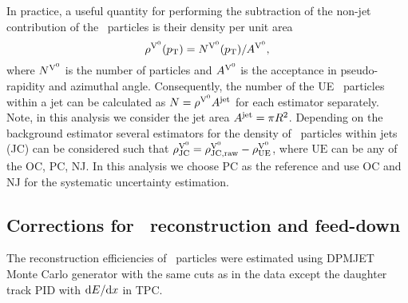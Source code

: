In practice, a useful quantity for performing the subtraction of the non-jet contribution of the \Vzero\ particles is their density per unit area 
\begin{equation}
\rho^{{\rm V}^{0}}(p_{\mathrm{T}}) = N^{{\rm V}^{0}}(p_{\mathrm{T}}) / A^{{\rm V}^{0}},
\label{eq:defv0rho}
\end{equation}
where $N^{{\rm V}^{0}}$ is the number of particles and $A^{{\rm V}^{0}}$ is the acceptance in pseudo-rapidity and azimuthal angle. Consequently, the number of the UE \Vzero\ particles within a jet can be calculated as $N=\rho^{{\rm V}^{0}} A^{\mathrm{jet}}$ for each estimator separately. Note, in this analysis we consider the jet area $A^{\mathrm{jet}} = \pi R^2$. Depending on the background estimator several estimators for the density of \Vzero\ particles within jets (JC) can be considered such that $ \rho^{{\rm V}^{0}} _{\mathrm{JC}} =  \rho^{{\rm V}^{0}} _{\mathrm{JC, raw}} -  \rho^{{\rm V}^{0}} _{\mathrm{UE}}$, where $\mathrm{UE}$ can be any of the OC, PC, NJ. In this analysis we choose PC as the reference and use OC and NJ for the systematic uncertainty estimation.

\subsection{Corrections for \Vzero\ reconstruction and feed-down}
\label{sec:c05V0EffiMC}

The reconstruction efficiencies of \Vzero\ particles were estimated using DPMJET Monte Carlo generator \cite{Roesler:2000he} with the same cuts as in the data except the daughter track PID with ${\rm d}E/{\rm d}x$ in TPC. 

